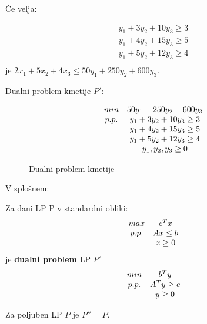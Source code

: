 \documentclass[11pt, a4paper]{article}
\begin{document}
    Če velja:
    
    \[
        \begin{array}{c}
            y_1+3y_2+10y_3 \ge 3 \\
            y_1+4y_2+15y_3 \ge 5 \\
            y_1+5y_2+12y_3 \ge 4 \\ 
        \end{array}
    \]
    je \(2x_1+5x_2+4x_3 \le 50y_1+250y_2+600y_3\).

    Dualni problem kmetije \(P'\):
    \begin{figure}[h!]
        \[
            \begin{array}{ c c }
                min & 50 y_1+250y_2+600y_3 \\
                p.p. & y_1+3y_2+10y_3 \ge 3 \\
                & y_1+4y_2+15y_3 \ge 5 \\
                & y_1+5y_2+12y_3 \ge 4 \\
                & y_1,y_2,y_3 \ge 0 \\
            \end{array}
        \]
        \caption{Dualni problem kmetije}
    \end{figure}

    V splošnem:
    \begin{definition}[Dualni LP]
        Za dani LP P v standardni obliki:
        \[
            \begin{array}{ c c }
                max & c^Tx \\
                p.p. & Ax \le b \\
                & x \ge 0 \\
            \end{array}    
        \]
        je \textbf{dualni problem} LP \(P'\)
        \[
            \begin{array}{ c c }
                min & b^Ty \\
                p.p. & A^Ty \ge c \\
                & y \ge 0 \\
            \end{array}
        \]
    \end{definition}

    \begin{proposition}
        Za poljuben LP \(P\) je \(P''=P\).
    \end{proposition}
\end{document}
